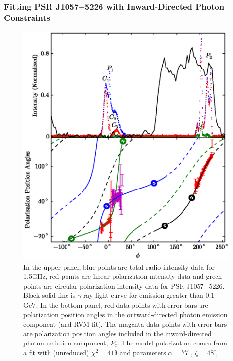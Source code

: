 \subsubsection{Fitting PSR J1057$-$5226 with Inward-Directed Photon Constraints}

\begin{figure}[htbp]
\begin{center}
\includegraphics[scale=.8]{chapters/inwardDirectedPhotons/figures/intAndPAJ1057alpha77zeta50V2.eps}
\caption[ Intensity and polarization data for PSR J1057$-$5226 overlaid with bidirectional model]{\label{fig:singleAlt}
In the upper panel, blue points are total radio intensity 
data for 1.5GHz, red points are linear polarization intensity data
and green points are circular polarization intensity data for 
PSR J1057$-$5226.  Black solid line is $\gamma$-ray light
curve for emission greater than 0.1 GeV.
In the bottom panel, red data points with error bars are polarization position angles
in the outward-directed photon emission component (and RVM fit). The magenta data points with error bars are polarization 
position angles included in the inward-directed photon emission component, $P_{2}$.
The model polarization comes from
a fit with (unreduced) $\chi^2=419$ and parameters $\alpha=77^{\circ}$, $\zeta=48^{\circ}$,
}
\end{center}
\end{figure}
